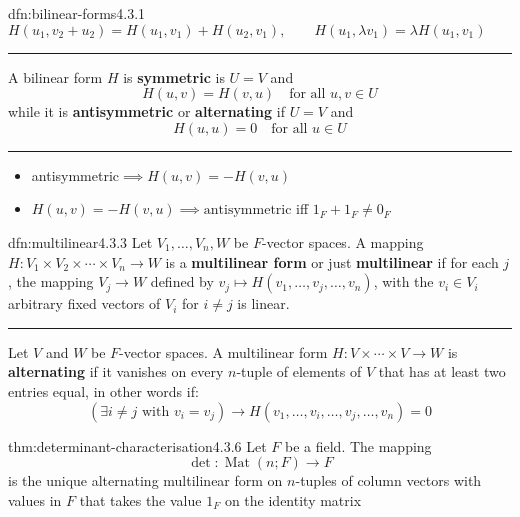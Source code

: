 \documentclass[landscape, 8pt]{extarticle}
\DeclareMathOperator{\Mat}{Mat}
\begin{document}
\begin{multicols}{3}
\begin{dfn}{dfn:bilinear-forms}{4.3.1}
        $H(u_{1}, v_{2} + u_{2}) = H(u_{1}, v_{1}) + H(u_{2}, v_{1}), \qquad H(u_{1},\lambda v_{1}) = \lambda H(u_{1}, v_{1})$
    \vspace{5pt}
    \noindent\rule{\textwidth}{0.2pt}
    \vspace{-10pt}

    A bilinear form $H$ is \textbf{symmetric} is $U = V$ and
    \[H(u,v) = H(v,u)\quad \text{for all } u,v\in U\]
    while it is \textbf{antisymmetric} or \textbf{alternating} if $U = V$ and
    \[H(u, u) = 0 \quad\text{for all } u\in U\]

    \vspace{-7pt}
    \noindent\rule{\textwidth}{0.2pt}
    \vspace{-10pt}
    \begin{itemize}[leftmargin=*]
        \item antisymmetric$\implies H(u, v) = -H(v, u)$
        \item $H(u, v) = -H(v, u) \implies \text{antisymmetric}$ iff $1_{F} + 1_{F} \ne 0_{F}$
    \end{itemize}
\end{dfn}

\begin{dfn}{dfn:multilinear}{4.3.3}
    Let $V_{1},\dots,V_{n}, W$ be $F$-vector spaces. A mapping $H : V_{1} \times V_{2} \times \cdots \times V_{n} \to W$ is a \textbf{multilinear form} or just \textbf{multilinear} if for each $j$, the mapping $V_{j}\to W$ defined by $v_{j}\mapsto H(v_{1},\dots,v_{j},\dots,v_{n})$, with the $v_{i}\in V_{i}$ arbitrary fixed vectors of $V_{i}$ for $i\ne j$ is linear. 

    \noindent\rule{\textwidth}{0.2pt}
    Let $V$ and $W$ be $F$-vector spaces. A multilinear form $ H : V \times \cdots \times V \to W$ is \textbf{alternating} if it vanishes on every $n$-tuple of elements of $V$ that has at least two entries equal, in other words if:
    \[(\exists i\ne j \text{ with } v_{i} = v_{j})\to H(v_{1},\dots,v_{i},\dots,v_{j},\dots,v_{n}) = 0\]
\end{dfn}

\begin{thm}{thm:determinant-characterisation}{4.3.6}
    Let $F$ be a field. The mapping
    \[\det : \Mat(n;F) \to F\]
    is the unique alternating multilinear form on $n$-tuples of column vectors with values in $F$ that takes the value $1_{F}$ on the identity matrix
\end{thm}


\end{multicols}
\end{document}
